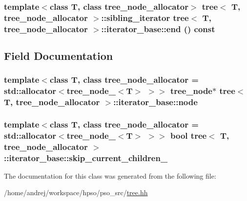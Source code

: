 \hypertarget{classtree_1_1iterator__base_399dabd62f0659c02bfda59b26bdeefe}{
\subsubsection{\setlength{\rightskip}{0pt plus 5cm}template$<$class T, class tree\_\-node\_\-allocator$>$ {\bf tree}$<$ T, tree\_\-node\_\-allocator $>$::{\bf sibling\_\-iterator} {\bf tree}$<$ T, tree\_\-node\_\-allocator $>$::iterator\_\-base::end () const}}
\label{classtree_1_1iterator__base_399dabd62f0659c02bfda59b26bdeefe}




\subsection{Field Documentation}
\hypertarget{classtree_1_1iterator__base_8e012d9505968cd1b51afab5bb4f2bf0}{
\subsubsection{\setlength{\rightskip}{0pt plus 5cm}template$<$class T, class tree\_\-node\_\-allocator = std::allocator$<$tree\_\-node\_\-$<$T$>$ $>$$>$ {\bf tree\_\-node}$\ast$ {\bf tree}$<$ T, tree\_\-node\_\-allocator $>$::{\bf iterator\_\-base::node}}}
\label{classtree_1_1iterator__base_8e012d9505968cd1b51afab5bb4f2bf0}


\hypertarget{classtree_1_1iterator__base_88239267268c728952e0cd89b9326e82}{
\subsubsection{\setlength{\rightskip}{0pt plus 5cm}template$<$class T, class tree\_\-node\_\-allocator = std::allocator$<$tree\_\-node\_\-$<$T$>$ $>$$>$ bool {\bf tree}$<$ T, tree\_\-node\_\-allocator $>$::{\bf iterator\_\-base::skip\_\-current\_\-children\_\-}}}
\label{classtree_1_1iterator__base_88239267268c728952e0cd89b9326e82}




The documentation for this class was generated from the following file:\begin{CompactItemize}
\item 
/home/andrej/workspace/hpso/pso\_\-src/\hyperlink{tree_8hh}{tree.hh}\end{CompactItemize}
